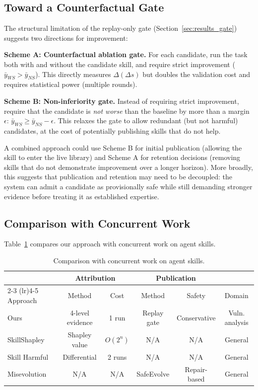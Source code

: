 ﻿\documentclass[preprint,12pt]{elsarticle}
\begin{document}
\subsection{Toward a Counterfactual Gate}
\label{sec:counterfactual_gate}

The structural limitation of the replay-only gate
(Section~\ref{sec:results_gate}) suggests two directions for improvement:

\textbf{Scheme A: Counterfactual ablation gate.} For each candidate, run
the task both with and without the candidate skill, and require strict
improvement ($\bar{y}_{WS} > \bar{y}_{NS}$).  This directly measures
$\Delta(\Delta s)$ but doubles the validation cost and requires
statistical power (multiple rounds).

\textbf{Scheme B: Non-inferiority gate.} Instead of requiring strict
improvement, require that the candidate is \emph{not worse} than the
baseline by more than a margin $\epsilon$: $\bar{y}_{WS} \geq
\bar{y}_{NS} - \epsilon$.  This relaxes the gate to allow redundant (but
not harmful) candidates, at the cost of potentially publishing skills that
do not help.

A combined approach could use Scheme B for initial publication (allowing
the skill to enter the live library) and Scheme A for retention decisions
(removing skills that do not demonstrate improvement over a longer
horizon).  More broadly, this suggests that publication and retention may
need to be decoupled: the system can admit a candidate as provisionally
safe while still demanding stronger evidence before treating it as
established expertise.

\subsection{Comparison with Concurrent Work}

Table~\ref{tab:comparison} compares our approach with concurrent work on
agent skills.

\begin{table}[t]
\centering
\caption{Comparison with concurrent work on agent skills.}
\label{tab:comparison}
\footnotesize
\begin{tabular}{l c c c c c}
\toprule
& \multicolumn{2}{c}{Attribution} & \multicolumn{2}{c}{Publication} & \\
\cmidrule(lr){2-3} \cmidrule(lr){4-5}
Approach & Method & Cost & Method & Safety & Domain \\
\midrule
Ours & 4-level evidence & 1 run & Replay gate & Conservative & Vuln. analysis \\
SkillShapley~\cite{skillshapley} & Shapley value & $O(2^n)$ & N/A & N/A & General \\
Skill Harmful~\cite{skillharmful} & Differential & 2 runs & N/A & N/A & General \\
Misevolution~\cite{misevolution} & N/A & N/A & SafeEvolve & Repair-based & General \\
\bottomrule
\end{tabular}
\end{table}
\end{document}
